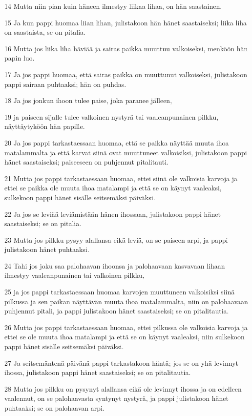 \par 14 Mutta niin pian kuin häneen ilmestyy liikaa lihaa, on hän saastainen.
\par 15 Ja kun pappi huomaa liian lihan, julistakoon hän hänet saastaiseksi; liika liha on saastaista, se on pitalia.
\par 16 Mutta jos liika liha häviää ja sairas paikka muuttuu valkoiseksi, menköön hän papin luo.
\par 17 Ja jos pappi huomaa, että sairas paikka on muuttunut valkoiseksi, julistakoon pappi sairaan puhtaaksi; hän on puhdas.
\par 18 Ja jos jonkun ihoon tulee paise, joka paranee jälleen,
\par 19 ja paiseen sijalle tulee valkoinen nystyrä tai vaaleanpunainen pilkku, näyttäytyköön hän papille.
\par 20 Ja jos pappi tarkastaessaan huomaa, että se paikka näyttää muuta ihoa matalammalta ja että karvat siinä ovat muuttuneet valkoisiksi, julistakoon pappi hänet saastaiseksi; paiseeseen on puhjennut pitalitauti.
\par 21 Mutta jos pappi tarkastaessaan huomaa, ettei siinä ole valkoisia karvoja ja ettei se paikka ole muuta ihoa matalampi ja että se on käynyt vaaleaksi, sulkekoon pappi hänet sisälle seitsemäksi päiväksi.
\par 22 Ja jos se leviää leviämistään hänen ihossaan, julistakoon pappi hänet saastaiseksi; se on pitalia.
\par 23 Mutta jos pilkku pysyy alallansa eikä leviä, on se paiseen arpi, ja pappi julistakoon hänet puhtaaksi.
\par 24 Tahi jos joku saa palohaavan ihoonsa ja palohaavaan kasvavaan lihaan ilmestyy vaaleanpunainen tai valkoinen pilkku,
\par 25 ja jos pappi tarkastaessaan huomaa karvojen muuttuneen valkoisiksi siinä pilkussa ja sen paikan näyttävän muuta ihoa matalammalta, niin on palohaavaan puhjennut pitali, ja pappi julistakoon hänet saastaiseksi; se on pitalitautia.
\par 26 Mutta jos pappi tarkastaessaan huomaa, ettei pilkussa ole valkoisia karvoja ja ettei se ole muuta ihoa matalampi ja että se on käynyt vaaleaksi, niin sulkekoon pappi hänet sisälle seitsemäksi päiväksi.
\par 27 Ja seitsemäntenä päivänä pappi tarkastakoon häntä; jos se on yhä levinnyt ihossa, julistakoon pappi hänet saastaiseksi; se on pitalitautia.
\par 28 Mutta jos pilkku on pysynyt alallansa eikä ole levinnyt ihossa ja on edelleen vaalennut, on se palohaavasta syntynyt nystyrä, ja pappi julistakoon hänet puhtaaksi; se on palohaavan arpi.
